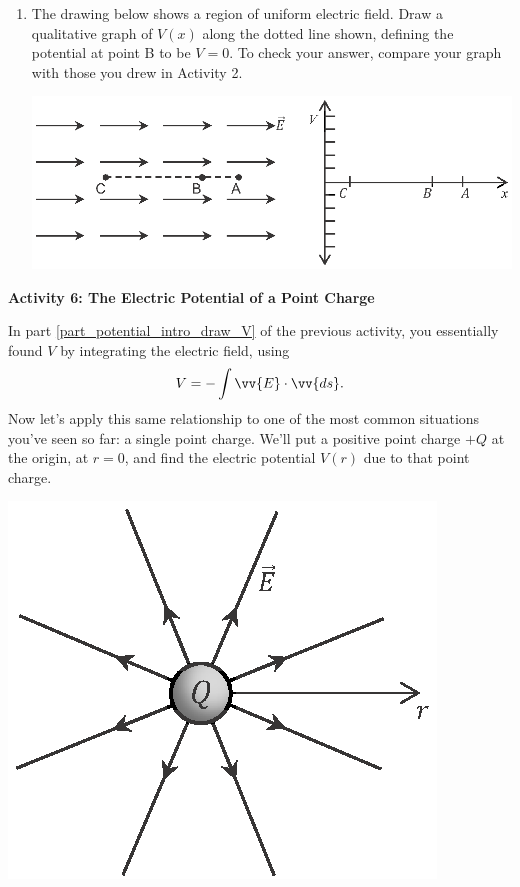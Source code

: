 \begin{enumerate}[wide, label=(\emph{\alph*})]
\item The drawing below shows a region of uniform electric field.  Draw a qualitative graph of $V(x)$ along the dotted line shown, defining the potential at point B to be $V=0$.  To check your answer, compare your graph with those you drew in Activity 2.  \label{part_potential_intro_draw_V} 
\begin{center}
\vspace{-0.1 in}
\includegraphics{potential_intro/activity_5_figs/uniform_E_field_3.eps}
\end{center}

\end{enumerate}

\textbf{Activity 6: The Electric Potential of a Point Charge}

In part \ref{part_potential_intro_draw_V} of the previous activity, you essentially found $V$ by integrating the electric field, using
$$V=-\int{\vv{E} \cdot \vv{ds}}.$$
Now let's apply this same relationship to one of the most common situations you've seen so far: a single point charge.  We'll put a positive point charge $+Q$ at the origin, at $r=0$, and find the electric potential $V(r)$ due to that point charge.
\begin{center}
\vspace{-0.1 in}
\includegraphics{potential_intro/activity_6_figs/point_charge_E_field_axis.eps}
\end{center}

